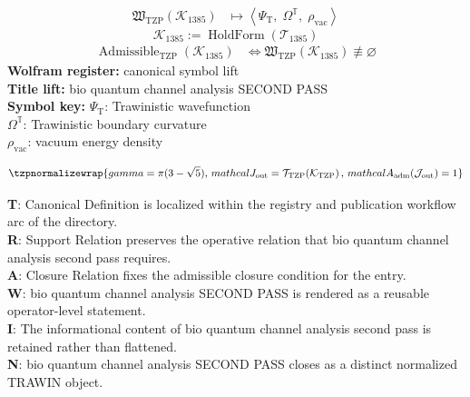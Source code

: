 \noindent
\begin{minipage}[t]{0.48\linewidth}
\begingroup
\small
\[
\begin{aligned}
\mathfrak{W}_{\mathrm{TZP}}\!\left(\mathcal{K}_{1385}\right)
&\longmapsto
\left\langle \Psi_{\mathrm{T}},\; \Omega^{\mathbb{T}},\; \rho_{\mathrm{vac}} \right\rangle
\end{aligned}
\]
\[
\mathcal{K}_{1385}
:=
\operatorname{HoldForm}\!\left(\mathcal{T}_{1385}\right)
\]
\[
\begin{aligned}
\operatorname{Admissible}_{\mathrm{TZP}}\!\left(\mathcal{K}_{1385}\right)
&\Longleftrightarrow
\mathfrak{W}_{\mathrm{TZP}}\!\left(\mathcal{K}_{1385}\right)\not\equiv\varnothing
\end{aligned}
\]
\textbf{Wolfram register:} canonical symbol lift\\
\textbf{Title lift:} bio quantum channel analysis SECOND PASS\\
\textbf{Symbol key:} \(\Psi_{\mathrm{T}}\): Trawinistic wavefunction\\ \(\Omega^{\mathbb{T}}\): Trawinistic boundary curvature\\ \(\rho_{\mathrm{vac}}\): vacuum energy density
\par
\endgroup
\end{minipage}\hfill
\begin{minipage}[t]{0.48\linewidth}
\[
\tzpnormalizewrap{gamma=\pi(3-\sqrt{5}),\,mathcal{J}_{\mathrm{out}} = \mathcal{T}_{\mathrm{TZP}}\!\left(\mathcal{K}_{\mathrm{TZP}}\right),\,mathcal{A}_{\mathrm{adm}}\!\left(\mathcal{J}_{\mathrm{out}}\right)=1}
\]

\small
\textbf{T}: Canonical Definition is localized within the registry and publication workflow arc of the directory.\\
\textbf{R}: Support Relation preserves the operative relation that bio quantum channel analysis second pass requires.\\
\textbf{A}: Closure Relation fixes the admissible closure condition for the entry.\\
\textbf{W}: bio quantum channel analysis SECOND PASS is rendered as a reusable operator-level statement.\\
\textbf{I}: The informational content of bio quantum channel analysis second pass is retained rather than flattened.\\
\textbf{N}: bio quantum channel analysis SECOND PASS closes as a distinct normalized TRAWIN object.
\normalsize
\end{minipage}

